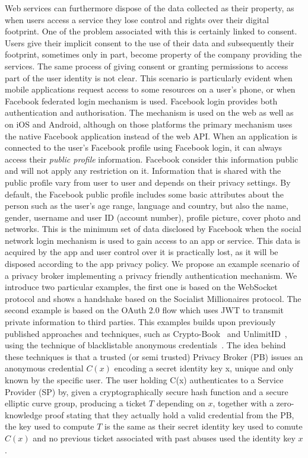 Web services can furthermore dispose of the data collected as their property, as when users access a service they lose control and rights over their digital footprint. One of the problem associated with this is certainly linked to consent. Users give their implicit consent to the use of their data and subsequently their footprint, sometimes only in part, become property of the company providing the services. The same process of giving consent or granting permissions to access part of the user identity is not clear. This scenario is particularly evident when mobile applications request access to some resources on a user's phone, or when Facebook federated login mechanism is used. Facebook login provides both authentication and authorisation. The mechanism is used on the web as well as on iOS and Android, although on those platforms the primary mechanism uses the native Facebook application instead of the web API. When an application is connected to the user's Facebook profile using Facebook login, it can always access their \emph{public profile} information. Facebook consider this information public and will not apply any restriction on it. Information that is shared with the public profile vary from user to user and depends on their privacy settings. By default, the Facebook public profile includes some basic attributes about the person such as the user's age range, language and country, but also the name, gender, username and user ID (account number), profile picture, cover photo and networks. This is the minimum set of data disclosed by Facebook when the social network login mechanism is used to gain access to an app or service. This data is acquired by the app and user control over it is practically lost, as it will be disposed according to the app privacy policy.
We propose an example scenario of a privacy broker implementing a privacy friendly authentication mechanism. We introduce two particular examples, the first one is based on the WebSocket protocol and shows a handshake based on the Socialist Millionaires protocol. The second example is based on the OAuth 2.0 flow which uses JWT to transmit private information to third parties. This examples builds upon previously published approaches and techniques, such as Crypto-Book~\cite{maheswaran2013crypto} and UnlimitID~\cite{isaakidis2016unlimitid}, using the technique of blacklistable anonymous credentials~\cite{tsang2007blacklistable}. The idea behind these techniques is that a trusted (or semi trusted) Privacy Broker (PB) issues an anonymous credential $C(x)$ encoding a secret identity key x, unique and only known by the specific user. The user holding C(x) authenticates to a Service Provider (SP) by, given a cryptographically secure hash function and a secure elliptic curve group, producing a ticket $T$ depending on $x$, together with a zero-knowledge proof stating that they actually hold a valid credential from the PB, the key used to compute $T$ is the same as their secret identity key used to comute $C(x)$ and no previous ticket associated with past abuses used the identity key $x$. 
